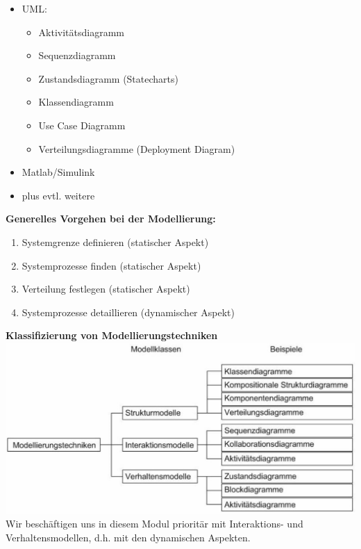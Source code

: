 \begin{multicols}{2}
	\begin{itemize}
		\item UML:
		\begin{itemize}
			\item Aktivitätsdiagramm
			\item Sequenzdiagramm
			\item Zustandsdiagramm (Statecharts)
			\item Klassendiagramm
			\item Use Case Diagramm
			\item Verteilungsdiagramme (Deployment Diagram)
		\end{itemize}
		\item Matlab/Simulink
		\item plus evtl. weitere
	\end{itemize}
	\vfill\null
	\columnbreak

	\textbf{Generelles Vorgehen bei der Modellierung:}
	\begin{enumerate}
		\item Systemgrenze definieren (statischer Aspekt)
		\item Systemprozesse finden (statischer Aspekt)
		\item Verteilung festlegen (statischer Aspekt)
		\item Systemprozesse detaillieren (dynamischer Aspekt)
	\end{enumerate}

	\textbf{Klassifizierung von Modellierungstechniken}\\
	\includegraphics[width=\linewidth]{./images/Modellierung/klassifizierungModellierungstechniken}
	Wir beschäftigen uns in diesem Modul prioritär mit Interaktions- und Verhaltensmodellen, d.h. mit den dynamischen Aspekten.
\end{multicols}


